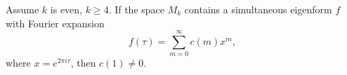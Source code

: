 Assume $k$ is even, $k \geq 4$. If the space $M_k$ contains a simultaneous eigenform $f$ with Fourier expansion
$$f(\tau) = \sum_{m=0}^{\infty} c(m)x^m,$$
where $x = e^{2\pi i\tau}$, then $c(1) \neq 0$.
